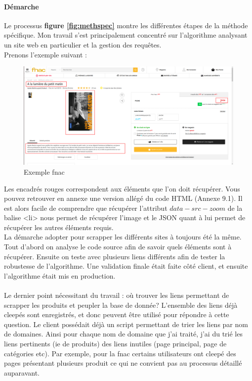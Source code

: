 \documentclass{article} %
\begin{document}
\paragraph{Démarche\\}
Le processus \textbf{figure \ref{fig:methspec}} montre les différentes étapes de la méthode spécifique. Mon travail s'est principalement concentré sur l'algorithme analysant un site web en particulier et la gestion des requêtes.\\
Prenons l'exemple suivant \cite{fnac} :
\begin{figure}[!h]
	\centering
	\includegraphics[keepaspectratio = true,scale=0.25]{fnac.png}
	\caption{Exemple fnac}
\end{figure}
Les encadrés rouges correspondent aux éléments que l'on doit récupérer. Vous pouvez retrouver en annexe une version allégé du code HTML (Annexe 9.1). Il est alors facile de comprendre que récupérer l'attribut $data-src-zoom$ de la balise <li> nous permet de récupérer l'image et le JSON quant à lui permet de récupérer les autres éléments requis.\\
La démarche adopter pour scrapper les différents sites à toujours été la même. Tout d'abord on analyse le code source afin de savoir quels éléments sont à récupérer. Ensuite on teste avec plusieurs liens différents afin de tester la robustesse de l'algorithme. Une validation finale était faite côté client, et ensuite l'algorithme était mis en production.\\ \\
Le dernier point nécessitant du travail : où trouver les liens permettant de scrapper les produits et peupler la base de donnée? L'ensemble des liens déjà cleepés sont enregistrés, et donc peuvent être utilisé pour répondre à cette question. Le client possédait déjà un script permettant de trier les liens par nom de domaines. Ainsi pour chaque nom de domaine que j'ai traité, j'ai du trié les liens pertinents (ie de produits) des liens inutiles (page principal, page de catégories etc). Par exemple, pour la fnac certains utilisateurs ont cleepé des pages présentant plusieurs produit \cite{mve} ce qui ne convient pas au processus détaillé auparavant.
\end{document}
